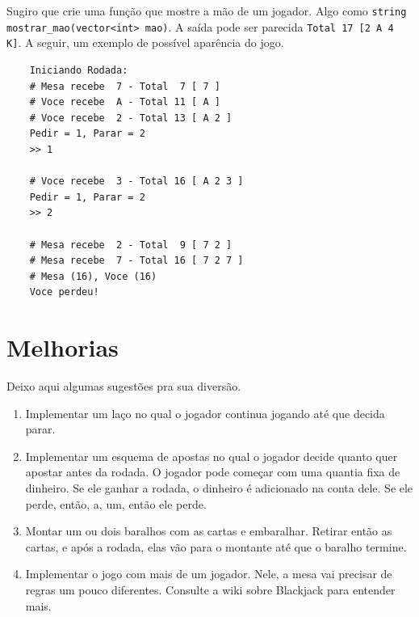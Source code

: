 \documentclass[12pt]{article}
\newcommand{\code}[1]{\lstinline|#1|} %
\begin{document}
Sugiro que crie uma função que mostre a mão de um jogador. Algo como \code{string mostrar_mao(vector<int> mao)}.
A saída pode ser parecida \code{Total 17 [2 A 4 K]}. A seguir, um exemplo de possível aparência do jogo.

\begin{mdframed}[nobreak=true]

	\begin{verbatim}
	Iniciando Rodada:
	# Mesa recebe  7 - Total  7 [ 7 ]
	# Voce recebe  A - Total 11 [ A ]
	# Voce recebe  2 - Total 13 [ A 2 ]
	Pedir = 1, Parar = 2 
	>> 1

	# Voce recebe  3 - Total 16 [ A 2 3 ]
	Pedir = 1, Parar = 2 
	>> 2

	# Mesa recebe  2 - Total  9 [ 7 2 ]
	# Mesa recebe  7 - Total 16 [ 7 2 7 ]
	# Mesa (16), Voce (16)
	Voce perdeu!
	\end{verbatim}
\end{mdframed}

\section{Melhorias}

Deixo aqui algumas sugestões pra sua diversão.
\begin{enumerate}
	\item Implementar um laço no qual o jogador continua jogando até que decida parar.
	\item Implementar um esquema de apostas no qual o jogador decide quanto quer apostar antes da rodada. O jogador pode começar com uma quantia fixa de dinheiro. Se ele ganhar a rodada, o dinheiro é adicionado na conta dele. Se ele perde, então, a, um, então ele perde.
	\item Montar um ou dois baralhos com as cartas e embaralhar. Retirar então as cartas, e após a rodada, elas vão para o montante até que o baralho termine. 
	\item Implementar o jogo com mais de um jogador. Nele, a mesa vai precisar de regras um pouco diferentes. Consulte a wiki sobre Blackjack para entender mais.
\end{enumerate}
\end{document}
